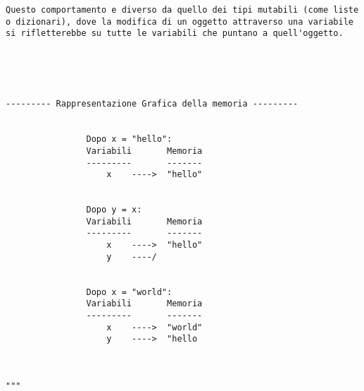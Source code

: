 \begin{lstlisting}
Questo comportamento e diverso da quello dei tipi mutabili (come liste o dizionari), dove la modifica di un oggetto attraverso una variabile si rifletterebbe su tutte le variabili che puntano a quell'oggetto.





--------- Rappresentazione Grafica della memoria ---------


                Dopo x = "hello":
                Variabili       Memoria
                ---------       -------
                    x    ---->  "hello"


                Dopo y = x:
                Variabili       Memoria
                ---------       -------
                    x    ---->  "hello"
                    y    ----/


                Dopo x = "world":
                Variabili       Memoria
                ---------       -------
                    x    ---->  "world"
                    y    ---->  "hello
                    
                    
                    
"""

\end{lstlisting}